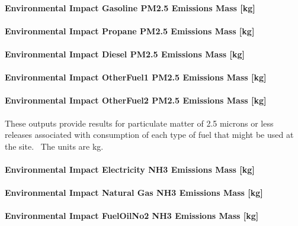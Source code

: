 \paragraph{Environmental Impact Gasoline PM2.5 Emissions Mass {[}kg{]}}\label{environmental-impact-gasoline-pm2.5-emissions-mass-kg}

\paragraph{Environmental Impact Propane PM2.5 Emissions Mass {[}kg{]}}\label{environmental-impact-propane-pm2.5-emissions-mass-kg}

\paragraph{Environmental Impact Diesel PM2.5 Emissions Mass {[}kg{]}}\label{environmental-impact-diesel-pm2.5-emissions-mass-kg}

\paragraph{Environmental Impact OtherFuel1 PM2.5 Emissions Mass {[}kg{]}}\label{environmental-impact-otherfuel1-pm2.5-emissions-mass-kg}

\paragraph{Environmental Impact OtherFuel2 PM2.5 Emissions Mass {[}kg{]}}\label{environmental-impact-otherfuel2-pm2.5-emissions-mass-kg}

These outputs provide results for particulate matter of 2.5 microns or less releases associated with consumption of each type of fuel that might be used at the site.~ The units are kg.

\paragraph{Environmental Impact Electricity NH3 Emissions Mass {[}kg{]}}\label{environmental-impact-electricity-nh3-emissions-mass-kg}

\paragraph{Environmental Impact Natural Gas NH3 Emissions Mass {[}kg{]}}\label{environmental-impact-natural-gas-nh3-emissions-mass-kg}

\paragraph{Environmental Impact FuelOilNo2 NH3 Emissions Mass {[}kg{]}}\label{environmental-impact-fuel-oil-2-nh3-emissions-mass-kg}


